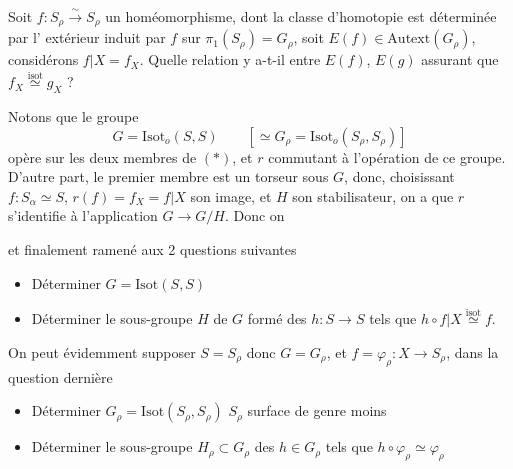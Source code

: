 \documentclass[11pt,a4paper]{article}
\begin{document}
Soit $f : S_{\rho} \xrightarrow{\sim} S_{\rho}$ un homéomorphisme, dont la
classe d'homotopie est déterminée par l'\struck{\ill{}} extérieur induit par
$f$ sur $\pi_1(S_{\rho}) = G_{\rho}$, soit $E(f) \in \mathrm{Autext}(G_{\rho})$,
 considérons $f \vert X = f_X$. Quelle relation y a-t-il
entre $E(f)$, $E(g)$ assurant que $f_X \overset{\mathrm{isot}}{\simeq} g_X$ ?




Notons que le groupe
\[
G = \mathrm{Isot}_{o}(S, S) \qquad [\simeq G_{\rho} = \mathrm{Isot}_{o}(S_{\rho}, S_{\rho})]
\]
opère sur les deux membres de $(*)$, et  $r$ commutant
à l'opération de ce groupe. D'autre part,   le
premier membre est un torseur sous $G$, donc, choisissant
$f : S_{\alpha} \simeq S$,  $r(f) = f_X = f \vert X$ \ill{} son
image, et $H$ son stabilisateur, on a que $r$ s'identifie à l'application
$G \to G/H$. Donc on


et finalement ramené aux 2 questions suivantes
\begin{itemize}
  \item[a)] Déterminer $G = \mathrm{Isot}(S, S)$
  \item[b)] Déterminer le sous-groupe $H$ de $G$ formé des $h : S \to S$ tels
  que $h \circ f \vert X \overset{\mathrm{isot}}{\simeq} f$.
\end{itemize}

On peut évidemment supposer $S = S_{\rho}$ donc $G = G_{\rho}$, et
$f = \varphi_{\rho} : X \to S_{\rho}$, dans la question dernière
\begin{itemize}
  \item[a)] Déterminer $G_{\rho} = \mathrm{Isot}(S_{\rho}, S_{\rho})$ \quad
  $S_{\rho}$ surface de genre \ill{} moins
  \item[b)] Déterminer le sous-groupe $H_{\rho} \subset G_{\rho}$ des
  $h \in G_{\rho}$ tels que 
  $h \circ \varphi_{\rho} \simeq \varphi_{\rho}$
\end{itemize}
\end{document}
